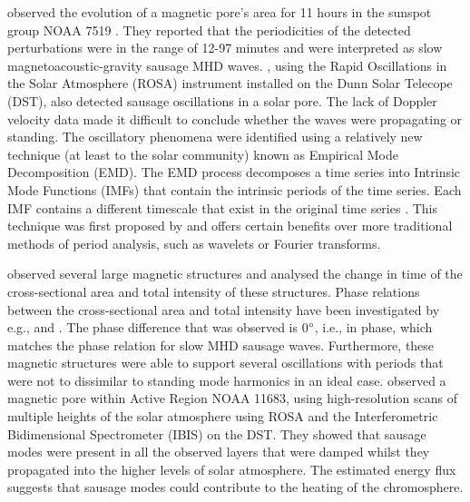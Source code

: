     \cite{doretala2008} observed the evolution of a magnetic pore's area for 11 hours in the sunspot group NOAA 7519 \citep[see][]{sobotka,doretalb}.
    They reported that the periodicities of the detected perturbations were in the range of 12-97 minutes and were interpreted as slow magnetoacoustic-gravity sausage MHD waves.
    \citet{morton2011}, using the Rapid Oscillations in the Solar Atmosphere (ROSA) instrument installed on the Dunn Solar Telecope (DST), also detected sausage oscillations in a solar pore. 
    The lack of Doppler velocity data made it difficult to conclude whether the waves were propagating or standing.
    The oscillatory phenomena were identified using a relatively new technique (at least to the solar community) known as Empirical Mode Decomposition (EMD).
    The EMD process decomposes a time series into Intrinsic Mode Functions (IMFs) that contain the intrinsic periods of the time series.
    Each IMF contains a different timescale that exist in the original time series \citep[see][]{terradas}.
    This technique was first proposed by \citet{huang} and offers certain benefits over more traditional methods of period analysis, such as wavelets or Fourier transforms. 
    
    \cite{Dorotovic2014} observed several large magnetic structures and analysed the change in time of the cross-sectional area and total intensity of these structures.
    Phase relations between the cross-sectional area and total intensity have been investigated by e.g., \citet{Moreels2013} and \citet{Moreels2013b}.
    The phase difference that was observed is 0$\degree$, i.e., in phase, which matches the phase relation for slow MHD sausage waves. 
    Furthermore, these magnetic structures were able to support several oscillations with periods that were not to dissimilar to standing mode harmonics in an ideal case.    
	\cite{0004-637X-806-1-132} observed a magnetic pore within Active Region NOAA 11683, using high-resolution scans of multiple heights of the solar atmosphere using ROSA and the Interferometric Bidimensional Spectrometer (IBIS) on the DST.
	They showed that sausage modes were present in all the observed layers that were damped whilst they propagated into the higher levels of solar atmosphere.
	The estimated energy flux suggests that sausage modes could contribute to the heating of the chromosphere.
    
